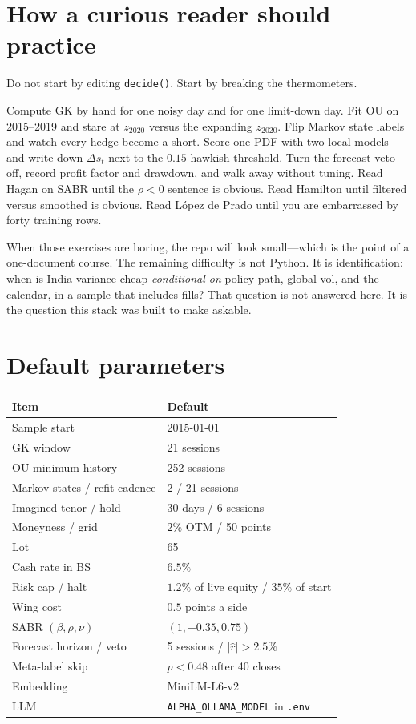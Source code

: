 \documentclass[11pt,a4paper]{article}
\begin{document}
\section{How a curious reader should practice}

Do not start by editing \texttt{decide()}. Start by breaking the thermometers.

Compute GK by hand for one noisy day and for one limit-down day. Fit OU on 2015--2019 and stare at $z_{2020}$ versus the expanding $z_{2020}$. Flip Markov state labels and watch every hedge become a short. Score one PDF with two local models and write down $\Delta s_t$ next to the $0.15$ hawkish threshold. Turn the forecast veto off, record profit factor and drawdown, and walk away without tuning. Read Hagan on SABR until the $\rho<0$ sentence is obvious. Read Hamilton until filtered versus smoothed is obvious. Read L\'opez de Prado until you are embarrassed by forty training rows.

When those exercises are boring, the repo will look small---which is the point of a one-document course. The remaining difficulty is not Python. It is identification: when is India variance cheap \emph{conditional on} policy path, global vol, and the calendar, in a sample that includes fills? That question is not answered here. It is the question this stack was built to make askable.

\newpage
\appendix
\section{Default parameters}

\begin{center}
\begin{tabular}{@{}ll@{}}
\toprule
Item & Default \\
\midrule
Sample start & 2015-01-01 \\
GK window & 21 sessions \\
OU minimum history & 252 sessions \\
Markov states / refit cadence & 2 / 21 sessions \\
Imagined tenor / hold & 30 days / 6 sessions \\
Moneyness / grid & $2\%$ OTM / 50 points \\
Lot & 65 \\
Cash rate in BS & $6.5\%$ \\
Risk cap / halt & $1.2\%$ of live equity / $35\%$ of start \\
Wing cost & $0.5$ points a side \\
SABR $(\beta,\rho,\nu)$ & $(1,-0.35,0.75)$ \\
Forecast horizon / veto & 5 sessions / $\lvert\hat r\rvert>2.5\%$ \\
Meta-label skip & $\hat p<0.48$ after 40 closes \\
Embedding & MiniLM-L6-v2 \\
LLM & \texttt{ALPHA\_OLLAMA\_MODEL} in \texttt{.env} \\
\bottomrule
\end{tabular}
\end{center}
\end{document}

